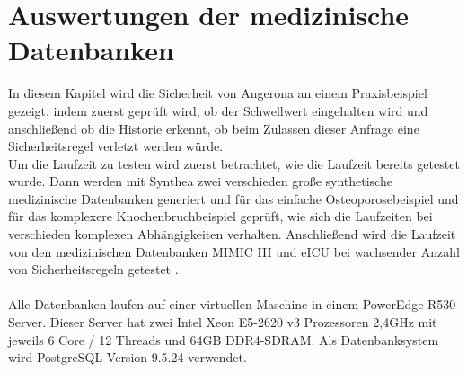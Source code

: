 \documentclass[german,version-2020-11]{uzl-thesis}
\begin{document}
\begin{figure}[htpb]
\end{figure}

\chapter{Auswertungen der medizinische Datenbanken }\label{chap:Auswertung}
In diesem Kapitel wird die Sicherheit von Angerona an einem Praxisbeispiel gezeigt, indem zuerst geprüft wird, ob der Schwellwert eingehalten wird und anschließend ob die Historie erkennt, ob beim Zulassen dieser Anfrage eine Sicherheitsregel verletzt werden würde. \\ Um die Laufzeit zu testen wird zuerst betrachtet, wie die Laufzeit bereits getestet wurde. Dann werden mit Synthea zwei verschieden große synthetische medizinische Datenbanken generiert und  für das einfache Osteoporosebeispiel und für das komplexere Knochenbruchbeispiel geprüft, wie sich die Laufzeiten bei verschieden komplexen Abhängigkeiten verhalten. Anschließend wird die Laufzeit von den medizinischen Datenbanken MIMIC III und eICU bei wachsender Anzahl von Sicherheitsregeln getestet . \\ \\
Alle Datenbanken laufen auf einer virtuellen Maschine in einem PowerEdge R530 Server. Dieser Server hat zwei Intel Xeon E5-2620 v3 Prozessoren 2,4GHz mit jeweils 6 Core / 12 Threads und 64GB DDR4-SDRAM. Als Datenbanksystem wird PostgreSQL Version 9.5.24 verwendet. \\ 
\end{document}
